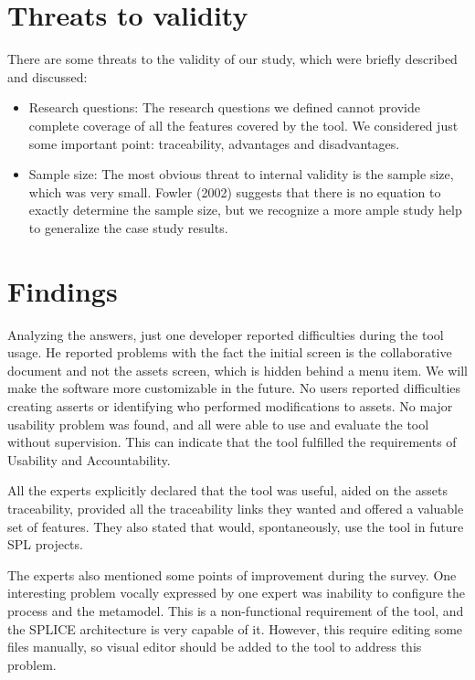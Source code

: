 \section{Threats to validity}
\label{sc:threats}
There  are some  threats  to  the  validity of our  study,  which  were briefly described and discussed:


\begin{itemize}
\item Research  questions:  The  research  questions  we  defined  cannot provide  complete  coverage  of  all the features covered by the tool. We considered just some important point: traceability, advantages and disadvantages. 

\item Sample  size:  The  most  obvious  threat  to  internal  validity  is  the sample  size,  which  was very small. Fowler  (2002)  suggests  that  there  is  no  equation  to  exactly determine the sample size, but we recognize a more ample study help to generalize the case study results.

\end{itemize}

\section{Findings}
\label{sc:leassonsLearned}


Analyzing the answers, just one developer reported difficulties during the tool usage. He reported problems with the fact the initial screen is the collaborative document and not the assets screen, which is hidden behind a menu item. We will make the software more customizable in the future. No users reported difficulties creating asserts or identifying who performed modifications to assets. No major usability problem was found, and all were able to use and evaluate the tool without supervision. This can indicate that the tool fulfilled the requirements of Usability and Accountability.

All the experts explicitly declared that the tool was useful, aided on the assets traceability, provided all the traceability links they wanted and offered a valuable set of features. They also stated that would, spontaneously, use the tool in future \ac{SPL} projects. 

The experts also mentioned some points of improvement during the survey. One interesting problem vocally expressed by one expert was inability to configure the process and the metamodel. This is a non-functional requirement of the tool, and the \ac{SPLICE} architecture is very capable of it. However, this require editing some files manually, so visual editor should be added to the tool to address this problem.

